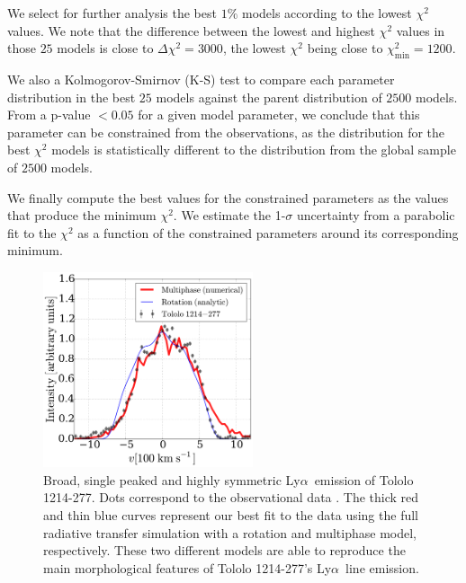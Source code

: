 \documentclass[a4,useAMS,usenatbib,usegraphicx]{mn2e}
\newcommand{\tol}{Tololo 1214-277}
\newcommand{\lya}{\ifmmode{{\rm Ly}\alpha}\else Ly$\alpha$\ \fi}
\begin{document}
We select for further analysis the best $1\%$ models according to the
lowest $\chi^2$ values.
We note that the difference between the lowest and highest $\chi^2$ values in
those $25$ models is close to $\Delta\chi^2 = 3000$, the lowest
$\chi^2$ being close to $\chi^2_{\mathrm{min}}=1200$. 

We also a Kolmogorov-Smirnov (K-S) test to compare each parameter
distribution in the best $25$ models against the parent distribution
of $2500$ models. 
From a p-value $<0.05$ for a given model parameter, we conclude that
this parameter can be constrained from the observations, as the distribution for
the best $\chi^2$ models is statistically different to the
distribution from the global sample of $2500$ models.  

We finally compute the best values for the constrained parameters as
the values that produce the minimum $\chi^2$.  
We estimate the 1-$\sigma$ uncertainty from a parabolic fit to the
$\chi^2$ as a function of the constrained parameters around its
corresponding minimum.   



\begin{figure}
\begin{center}
\includegraphics[width=0.55\textwidth]{CLARA-TOL-main.pdf}
\caption{Broad, single peaked and highly symmetric \lya emission of \tol.
  Dots correspond to the observational data \citep{mashesse03}. 
The thick red and thin blue curves represent our best fit
to the data using the full radiative transfer simulation with a
rotation and multiphase model, respectively. 
These two different models are able to reproduce the main morphological
features of \tol's \lya line emission.\label{fig:results}}
\end{center}
\end{figure}
\end{document}

